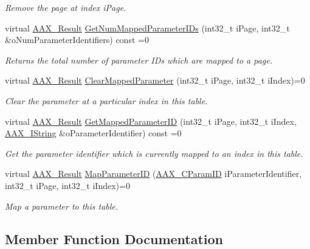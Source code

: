 \begin{DoxyCompactItemize}
\begin{DoxyCompactList}\small\item\em Remove the page at index {\ttfamily i\+Page}. \end{DoxyCompactList}\item 
virtual \hyperlink{a00149_a4d8f69a697df7f70c3a8e9b8ee130d2f}{A\+A\+X\+\_\+\+Result} \hyperlink{a00074_a5fe90fe5ca247a2111ff8892861daefb}{Get\+Num\+Mapped\+Parameter\+I\+Ds} (int32\+\_\+t i\+Page, int32\+\_\+t \&o\+Num\+Parameter\+Identifiers) const =0
\begin{DoxyCompactList}\small\item\em Returns the total number of parameter I\+Ds which are mapped to a page. \end{DoxyCompactList}\item 
virtual \hyperlink{a00149_a4d8f69a697df7f70c3a8e9b8ee130d2f}{A\+A\+X\+\_\+\+Result} \hyperlink{a00074_a15914845dbf7bc309f07f11b05e89016}{Clear\+Mapped\+Parameter} (int32\+\_\+t i\+Page, int32\+\_\+t i\+Index)=0
\begin{DoxyCompactList}\small\item\em Clear the parameter at a particular index in this table. \end{DoxyCompactList}\item 
virtual \hyperlink{a00149_a4d8f69a697df7f70c3a8e9b8ee130d2f}{A\+A\+X\+\_\+\+Result} \hyperlink{a00074_ae46125c9ca6f75f5a7bfbf523506c2b7}{Get\+Mapped\+Parameter\+I\+D} (int32\+\_\+t i\+Page, int32\+\_\+t i\+Index, \hyperlink{a00113}{A\+A\+X\+\_\+\+I\+String} \&o\+Parameter\+Identifier) const =0
\begin{DoxyCompactList}\small\item\em Get the parameter identifier which is currently mapped to an index in this table. \end{DoxyCompactList}\item 
virtual \hyperlink{a00149_a4d8f69a697df7f70c3a8e9b8ee130d2f}{A\+A\+X\+\_\+\+Result} \hyperlink{a00074_a7897faf269ab1d6aa56fcf463fbac783}{Map\+Parameter\+I\+D} (\hyperlink{a00149_a1440c756fe5cb158b78193b2fc1780d1}{A\+A\+X\+\_\+\+C\+Param\+I\+D} i\+Parameter\+Identifier, int32\+\_\+t i\+Page, int32\+\_\+t i\+Index)=0
\begin{DoxyCompactList}\small\item\em Map a parameter to this table. \end{DoxyCompactList}\end{DoxyCompactItemize}


\subsection{Member Function Documentation}
\hypertarget{a00074_a664fd7f2edd4f258f258541c85cf3a30}{}
